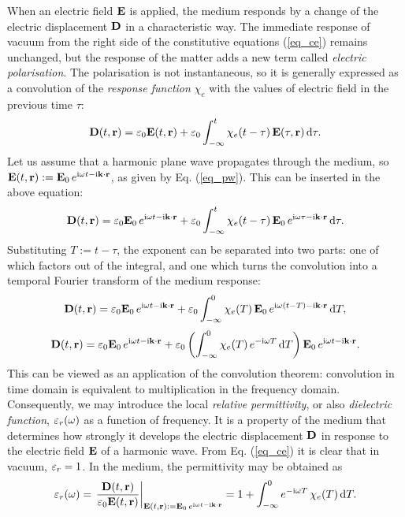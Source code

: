 When an electric field $\mathbf{E}$ is applied, the medium responds by a change of the electric displacement $\mathbf{D}$ in a characteristic way. 
The immediate response of vacuum from the right side of the constitutive equations (\ref{eq_ce}) remains unchanged, but the response of the matter adds a new term called \textit{electric polarisation}. The polarisation is not instantaneous, so it is generally expressed as a convolution of the \textit{response function} $\chi_e$ with the values of electric field in the previous time $\tau$:
\begin{equation} \mathbf{D}(t,{\mathbf{r}}) = \varepsilon_0 \mathbf{E}(t,{\mathbf{r}}) + \varepsilon_0 \int_{-\infty}^{t}\chi_e(t-\tau)\, \mathbf{E}(\tau,{\mathbf{r}})\,\mbox{d}\tau. \label{eq_loc_chi_convol}\end{equation}
Let us assume that a harmonic plane wave propagates through the medium, so $\mathbf{E}(t, {\mathbf{r}}) := \mathbf{E}_0 \, e^{{\mathrm i}\omega t - {\mathrm i}{\mathbf{k}}\cdot{\mathbf{r}}}$, as given by Eq. (\ref{eq_pw}). This can be inserted in the above equation:
\begin{equation} \mathbf{D}(t,{\mathbf{r}}) = \varepsilon_0 \mathbf{E}_0 \, e^{{\mathrm i}\omega t - {\mathrm i}{\mathbf{k}}\cdot{\mathbf{r}}} + \varepsilon_0 \int_{-\infty}^{t} \chi_e(t-\tau) \, \mathbf{E}_0 \, e^{{\mathrm i}\omega \tau - {\mathrm i}{\mathbf{k}}\cdot{\mathbf{r}}} \,\mbox{d}\tau. \label{eq_chi_convol_harm}\end{equation}
Substituting $T:=t-\tau$, the exponent can be separated into two parts: one of which factors out of the integral, and one which turns the convolution into a temporal Fourier transform of the medium response:
$$				 \mathbf{D}(t,{\mathbf{r}}) = \varepsilon_0 \mathbf{E}_0 \, e^{{\mathrm i}\omega t - {\mathrm i}{\mathbf{k}}\cdot{\mathbf{r}}} + \varepsilon_0 \int_{-\infty}^{0} \chi_e(T) \, \mathbf{E}_0 \, e^{{\mathrm i}\omega (t - T) - {\mathrm i}{\mathbf{k}}\cdot{\mathbf{r}}} \,\mbox{d}T,$$
$$				 \mathbf{D}(t,{\mathbf{r}}) = \varepsilon_0 \mathbf{E}_0 \, e^{{\mathrm i}\omega t - {\mathrm i}{\mathbf{k}}\cdot{\mathbf{r}}} + \varepsilon_0 \left( \int_{-\infty}^{0} \chi_e(T)  \, e^{-{\mathrm i}\omega T}\,\mbox{d}T  \right) \mathbf{E}_0 \, e^{{\mathrm i}\omega t - {\mathrm i}{\mathbf{k}}\cdot{\mathbf{r}}}.$$
This can be viewed as an application of the convolution theorem: convolution in time domain is equivalent to multiplication in the frequency domain.  %
Consequently, we may introduce the local \textit{relative permittivity}, or also \textit{dielectric function}, $\varepsilon_r(\omega)$ as a function of frequency. It is a property of the medium that determines how strongly it develops the electric displacement $\mathbf{D}$ in response to the electric field $\mathbf{E}$ of a harmonic wave.
From Eq. (\ref{eq_ce}) it is clear that in vacuum,  $\varepsilon_r = 1$. In the medium, the permittivity may be obtained as %
\begin{equation}  \varepsilon_r(\omega) = \left.\frac{\mathbf{D}(t,{\mathbf{r}})}{\varepsilon_0 \mathbf{E}(t,{\mathbf{r}})} \right|_{\mathbf{E}(t, {\mathbf{r}}) := \mathbf{E}_0 \, e^{{\mathrm i}\omega t - {\mathrm i}{\mathbf{k}}\cdot{\mathbf{r}}}} = 1 + \int_{-\infty}^{0} e^{-{\mathrm i}\omega T} \,\chi_e(T) \,\mbox{d}T. \label{eq_eps_loc}\end{equation}

